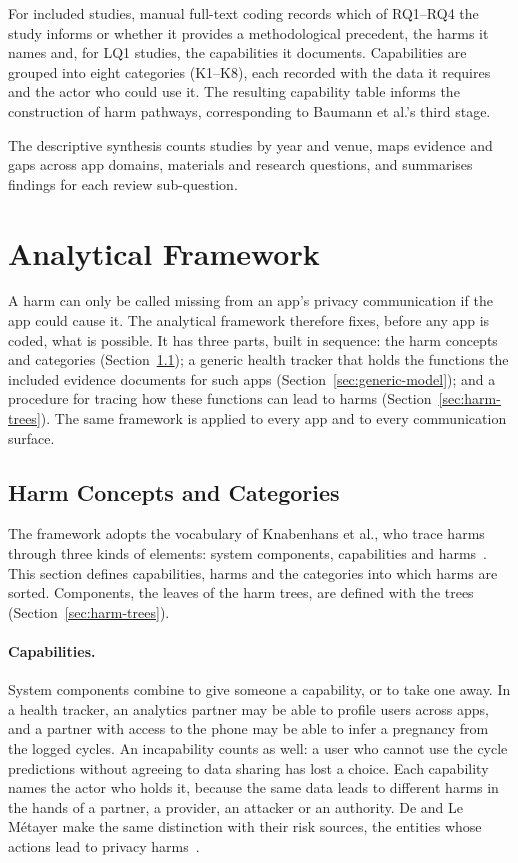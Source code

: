 For included studies, manual full-text coding records which of RQ1--RQ4 the study informs or
whether it provides a methodological precedent, the harms it names and, for LQ1 studies, the
capabilities it documents. Capabilities are grouped into eight categories (K1--K8), each
recorded with the data it requires and the actor who could use it. The resulting capability
table informs the construction of harm pathways, corresponding to Baumann et al.'s third stage.

The descriptive synthesis counts studies by year and venue, maps evidence and gaps across app
domains, materials and research questions, and summarises findings for each review
sub-question.

\section{Analytical Framework}
\label{sec:framework}
A harm can only be called missing from an app's privacy communication if the app could cause
it. The analytical framework therefore fixes, before any app is coded, what is possible. It has
three parts, built in sequence: the harm concepts and categories
(Section~\ref{sec:harm-categories}); a generic health tracker that holds the functions the
included evidence documents for such apps (Section~\ref{sec:generic-model}); and a procedure for
tracing how these functions can lead to harms (Section~\ref{sec:harm-trees}). The same framework
is applied to every app and to every communication surface.

\subsection{Harm Concepts and Categories}
\label{sec:harm-categories}
The framework adopts the vocabulary of Knabenhans et al., who trace harms through three kinds
of elements: system components, capabilities and
harms~\parencite[\S4.1]{knabenhans2026harms}. This section defines capabilities, harms and the
categories into which harms are sorted. Components, the leaves of the harm trees, are defined
with the trees (Section~\ref{sec:harm-trees}).

\paragraph{Capabilities.} System components combine to give someone a capability, or
to take one away. In a health tracker,
an analytics partner may be able to profile users across apps, and a partner
with access to the phone may be able to infer a pregnancy from the logged
cycles. An incapability counts as well: a user who cannot use the cycle
predictions without agreeing to data sharing has lost a choice. Each
capability names the actor who holds it, because the same data leads to
different harms in the hands of a partner, a provider, an attacker or an
authority. De and Le Métayer make the same distinction with their risk
sources, the entities whose actions lead to privacy
harms~\parencite{de2016privacy,knabenhans2026harms}.

